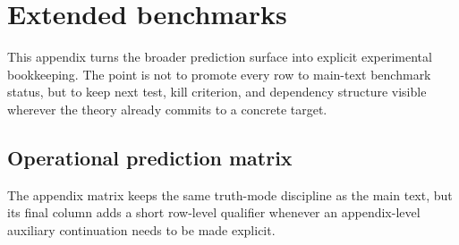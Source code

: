 \documentclass[11pt,a4paper]{article}
\theoremstyle{definition}
\theoremstyle{remark}
\begin{document}
\section{Extended benchmarks}
\label{app:benchmarks}

This appendix turns the broader prediction surface into explicit experimental bookkeeping. The point is not to promote every row to main-text benchmark status, but to keep next test, kill criterion, and dependency structure visible wherever the theory already commits to a concrete target.

\subsection{Operational prediction matrix}

The appendix matrix keeps the same truth-mode discipline as the main text, but its final column
adds a short row-level qualifier whenever an appendix-level auxiliary continuation needs to be
made explicit.
\end{document}
